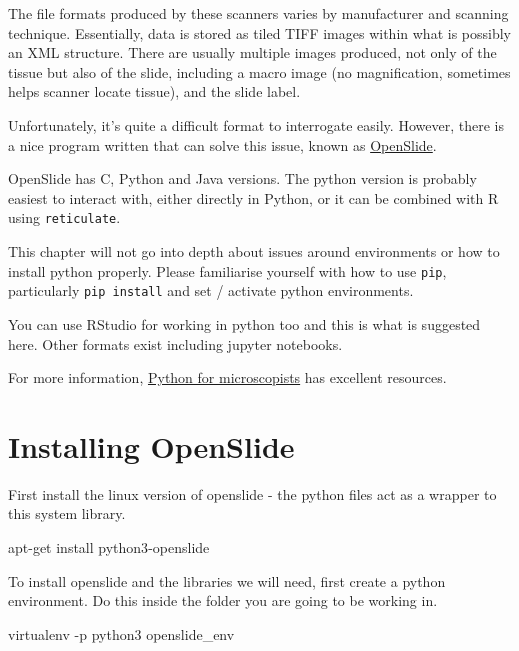 \documentclass[
]{book}
\newenvironment{Shaded}{\begin{snugshade}}{\end{snugshade}}
\newcommand{\AttributeTok}[1]{\textcolor[rgb]{0.77,0.63,0.00}{#1}}
\newcommand{\ExtensionTok}[1]{#1}
\newcommand{\NormalTok}[1]{#1}
\begin{document}
The file formats produced by these scanners varies by manufacturer and scanning technique. Essentially, data is stored as tiled TIFF images within what is possibly an XML structure. There are usually multiple images produced, not only of the tissue but also of the slide, including a macro image (no magnification, sometimes helps scanner locate tissue), and the slide label.

Unfortunately, it's quite a difficult format to interrogate easily. However, there is a nice program written that can solve this issue, known as \href{https://openslide.org/}{OpenSlide}.

OpenSlide has C, Python and Java versions. The python version is probably easiest to interact with, either directly in Python, or it can be combined with R using \texttt{reticulate}.

This chapter will not go into depth about issues around environments or how to install python properly. Please familiarise yourself with how to use \texttt{pip}, particularly \texttt{pip\ install} and set / activate python environments.

You can use RStudio for working in python too and this is what is suggested here. Other formats exist including jupyter notebooks.

For more information, \href{https://github.com/bnsreenu/python_for_microscopists}{Python for microscopists} has excellent resources.

\hypertarget{installing-openslide}{%
\section{Installing OpenSlide}\label{installing-openslide}}

First install the linux version of openslide - the python files act as a wrapper to this system library.

\begin{Shaded}
\begin{Highlighting}[]
\ExtensionTok{apt{-}get}\NormalTok{ install python3{-}openslide}
\end{Highlighting}
\end{Shaded}

To install openslide and the libraries we will need, first create a python environment. Do this inside the folder you are going to be working in.

\begin{Shaded}
\begin{Highlighting}[]
\ExtensionTok{virtualenv} \AttributeTok{{-}p}\NormalTok{ python3 openslide\_env}
\end{Highlighting}
\end{Shaded}
\end{document}
